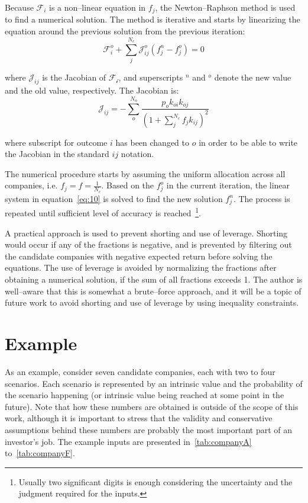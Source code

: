 \documentclass{article}
\begin{document}
\noindent Because $\mathcal{F}_i$ is a non--linear equation in $f_j$,
the Newton--Raphson method is used to find a numerical solution. The method is
iterative and starts by linearizing the equation around the previous solution
from the previous iteration:
\begin{equation}
\label{eq:10}
    \mathcal{F}_i^o + \sum_{j}^{N_c} \mathcal{J}_{ij}^o (f_j^n - f_j^o) = 0
\end{equation}

\noindent where $\mathcal{J}_{ij}$ is the Jacobian of $\mathcal{F_i}$, and
superscripts $^n$ and $^o$ denote the new value and the old value, respectively.
The Jacobian is:
\begin{equation}
\label{eq:11}
    \mathcal{J}_{ij}
  = 
    - \sum_{o}^{N_o}
      \frac{p_o k_{oi} k_{oj}}{\left(1 + \sum_{j}^{N_c} f_j k_{ij} \right)^2}
\end{equation}

\noindent where subscript for outcome $i$ has been changed to $o$ in order to be
able to write the Jacobian in the standard $ij$ notation.

The numerical procedure starts by assuming the uniform allocation across
all companies, i.e. $f_j = f = \frac{1}{N_c}$. Based on the $f_j^o$ in the
current iteration, the linear system in equation~\eqref{eq:10} is solved to find
the new solution $f_j^n$. The process is repeated until sufficient level of
accuracy is reached~\footnote{Usually two significant digits is enough
considering the uncertainty and the judgment required for the inputs.}.

A practical approach is used to prevent shorting and use of leverage. Shorting
would occur if any of the fractions is negative, and is prevented by filtering
out the candidate companies with negative expected return before solving the
equations. The use of leverage is avoided by normalizing the fractions after
obtaining a numerical solution, if the sum of all fractions exceeds 1. The
author is well--aware that this is somewhat a brute--force approach, and it will
be a topic of future work to avoid shorting and use of leverage by using
inequality constraints.

\section{Example}
\label{sec:example}

\noindent As an example, consider seven candidate companies, each with two to
four scenarios. Each scenario is represented by an intrinsic value and the
probability of the scenario happening (or intrinsic value being reached at some
point in the future). Note that how these numbers are obtained is outside of the
scope of this work, although it is important to stress that the validity and
conservative assumptions behind these numbers are probably the most important
part of an investor's job. The example inputs are presented
in~\autoref{tab:companyA} to~\autoref{tab:companyF}.
\end{document}
